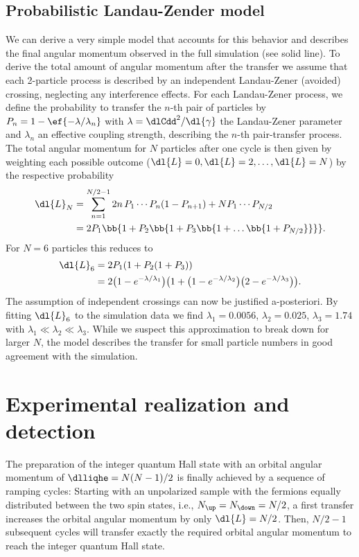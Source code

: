 \subsection{Probabilistic Landau-Zender model}
We can derive a very simple model that accounts for this behavior and describes the final angular momentum observed in the full simulation (see solid line).
To derive the total amount of angular momentum after the transfer we assume that each 2-particle process is described by an independent Landau-Zener (avoided) crossing, neglecting any interference effects. For each Landau-Zener process, we define the probability to transfer the $n$-th pair of particles by $P_n = 1-\ef{-\lambda/\lambda_n}$ with $\lambda=\dlCdd^2/\dl{\gamma}$ the Landau-Zener parameter and $\lambda_n$ an effective coupling strength, describing the $n$-th pair-transfer process. The total angular momentum for $N$ particles after one cycle is then given by weighting each possible outcome ($\dl{L}=0,\dl{L}=2,\dots,\dl{L}=N$) by the respective probability
\begin{align}
\dl{L}_N&=\sum_{n=1}^{N/2-1} 2n \,P_1\cdots P_n (1-P_{n+1})+N P_1\cdots P_{N/2}\\
&=2P_1\bb{1+P_2\bb{1+P_3\bb{1+\dots\bb{1+P_{N/2}}}}}.
\end{align}
For $N=6$ particles this reduces to
\begin{align}
\dl{L}_6&=2 P_1(1+P_2(1+P_3))\\
&=2 \big(1-e^{-\lambda/\lambda_1}\big) \big(1+\big(1-e^{-\lambda/\lambda_2}\big) \big(2-e^{-\lambda/\lambda_3}\big)\big).
\end{align}
The assumption of independent crossings can now be justified a-posteriori. By fitting $\dl{L}_6$ to the simulation data we find $\lambda_1=0.0056$, $\lambda_2=0.025$, $\lambda_3=1.74$ with $\lambda_1 \ll \lambda_2 \ll \lambda_3$. While we suspect this approximation to break down for larger $N$, the model describes the transfer for small particle numbers in good agreement with the simulation.

\section{Experimental realization and detection}

The preparation of the integer quantum Hall state with an orbital angular momentum of $\dlliqhe = N(N-1)/2$ is finally achieved by a sequence of ramping cycles: Starting with an unpolarized sample with the fermions equally distributed between the two spin states, i.e.,  $N_\up=N_\down=N/2$, a first transfer increases the orbital angular momentum by only $\dl{L}=N/2$. Then, $N/2-1$ subsequent cycles will transfer exactly the required orbital angular momentum to reach the integer quantum Hall state.

